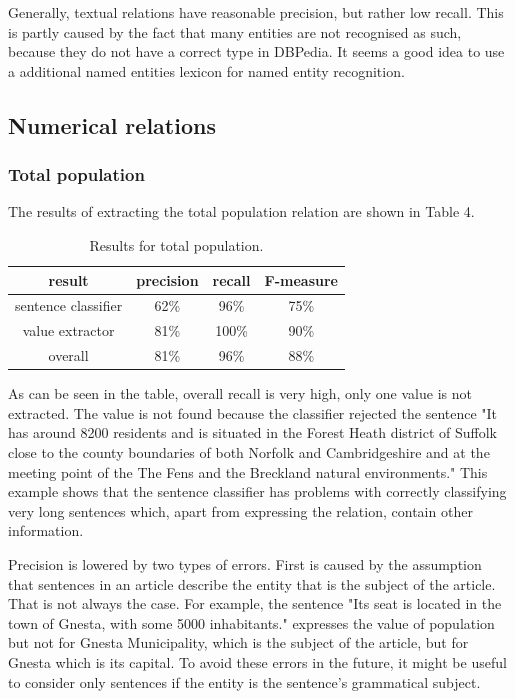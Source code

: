 \documentclass[10pt,a5paper,twoside]{article}
\begin{document}
Generally, textual relations have reasonable precision, but rather low recall. This is partly caused by the fact that many entities are not recognised as such, because they do not have a correct type in DBPedia. It seems a good idea to use a additional named entities lexicon for named entity recognition.

\subsection{Numerical relations}
\subsubsection{Total population}
The results of extracting the total population relation are shown in Table 4.
\begin{table}[!h]
\centering
\begin{tabular}{ | c | c | c | c | }
    \hline
    result & precision & recall & F-measure \\ \hline \hline
    sentence classifier & 62\% & 96\% & 75\% \\ \hline
    value extractor     & 81\% & 100\% & 90\% \\ \hline
    overall             & 81\% & 96\% & 88\% \\ \hline
\end{tabular}
\caption{Results for total population.}
\end{table}

As can be seen in the table, overall recall is very high, only one value is not extracted. The value is not found because the classifier rejected the sentence "It has around 8200 residents and is situated in the Forest Heath district of Suffolk close to the county boundaries of both Norfolk and Cambridgeshire and at the meeting point of the The Fens and the Breckland natural environments." This example shows that the sentence classifier has problems with correctly classifying very long sentences which, apart from expressing the relation, contain other information.

Precision is lowered by two types of errors. First is caused by the assumption that sentences in an article describe the entity that is the subject of the article. That is not always the case. For example, the sentence "Its seat is located in the town of Gnesta, with some 5000 inhabitants." expresses the value of population but not for Gnesta Municipality, which is the subject of the article, but for Gnesta which is its capital. To avoid these errors in the future, it might be useful to consider only sentences if the entity is the sentence's grammatical subject.
\end{document}
